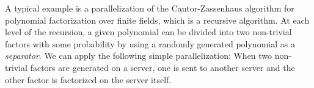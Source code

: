 %
%
%
A typical example is a parallelization of the Cantor-Zassenhaus
algorithm for polynomial factorization over finite fields,
which is a recursive algorithm.
At each level of the recursion, a given polynomial can be
divided into two non-trivial factors with some probability by using 
a randomly generated polynomial as a {\it separator}.
We can apply the following simple parallelization:
When two non-trivial factors are generated on a server,
one is sent to another server and the other factor is factorized on the server
itself. 
